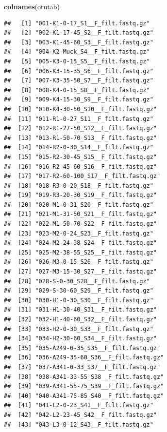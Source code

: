 \documentclass[]{article}
\newenvironment{Shaded}{\begin{snugshade}}{\end{snugshade}}
\newcommand{\KeywordTok}[1]{\textcolor[rgb]{0.13,0.29,0.53}{\textbf{#1}}}
\newcommand{\NormalTok}[1]{#1}
\begin{document}
\begin{Shaded}
\begin{Highlighting}[]
\KeywordTok{colnames}\NormalTok{(otutab)}
\end{Highlighting}
\end{Shaded}

\begin{verbatim}
##   [1] "001-K1-0-17_S1__F_filt.fastq.gz"         
##   [2] "002-K1-17-45_S2__F_filt.fastq.gz"        
##   [3] "003-K1-45-60_S3__F_filt.fastq.gz"        
##   [4] "004-K2-Muck_S4__F_filt.fastq.gz"         
##   [5] "005-K3-0-15_S5__F_filt.fastq.gz"         
##   [6] "006-K3-15-35_S6__F_filt.fastq.gz"        
##   [7] "007-K3-35-50_S7__F_filt.fastq.gz"        
##   [8] "008-K4-0-15_S8__F_filt.fastq.gz"         
##   [9] "009-K4-15-30_S9__F_filt.fastq.gz"        
##  [10] "010-K4-30-50_S10__F_filt.fastq.gz"       
##  [11] "011-R1-0-27_S11__F_filt.fastq.gz"        
##  [12] "012-R1-27-50_S12__F_filt.fastq.gz"       
##  [13] "013-R1-50-70_S13__F_filt.fastq.gz"       
##  [14] "014-R2-0-30_S14__F_filt.fastq.gz"        
##  [15] "015-R2-30-45_S15__F_filt.fastq.gz"       
##  [16] "016-R2-45-60_S16__F_filt.fastq.gz"       
##  [17] "017-R2-60-100_S17__F_filt.fastq.gz"      
##  [18] "018-R3-0-20_S18__F_filt.fastq.gz"        
##  [19] "019-R3-20-30_S19__F_filt.fastq.gz"       
##  [20] "020-M1-0-31_S20__F_filt.fastq.gz"        
##  [21] "021-M1-31-50_S21__F_filt.fastq.gz"       
##  [22] "022-M1-50-70_S22__F_filt.fastq.gz"       
##  [23] "023-M2-0-24_S23__F_filt.fastq.gz"        
##  [24] "024-M2-24-38_S24__F_filt.fastq.gz"       
##  [25] "025-M2-38-55_S25__F_filt.fastq.gz"       
##  [26] "026-M3-0-15_S26__F_filt.fastq.gz"        
##  [27] "027-M3-15-30_S27__F_filt.fastq.gz"       
##  [28] "028-S-0-30_S28__F_filt.fastq.gz"         
##  [29] "029-S-30-60_S29__F_filt.fastq.gz"        
##  [30] "030-H1-0-30_S30__F_filt.fastq.gz"        
##  [31] "031-H1-30-40_S31__F_filt.fastq.gz"       
##  [32] "032-H1-40-60_S32__F_filt.fastq.gz"       
##  [33] "033-H2-0-30_S33__F_filt.fastq.gz"        
##  [34] "034-H2-30-60_S34__F_filt.fastq.gz"       
##  [35] "035-A249-0-35_S35__F_filt.fastq.gz"      
##  [36] "036-A249-35-60_S36__F_filt.fastq.gz"     
##  [37] "037-A341-0-33_S37__F_filt.fastq.gz"      
##  [38] "038-A341-33-55_S38__F_filt.fastq.gz"     
##  [39] "039-A341-55-75_S39__F_filt.fastq.gz"     
##  [40] "040-A341-75-85_S40__F_filt.fastq.gz"     
##  [41] "041-L2-0-23_S41__F_filt.fastq.gz"        
##  [42] "042-L2-23-45_S42__F_filt.fastq.gz"       
##  [43] "043-L3-0-12_S43__F_filt.fastq.gz"        

\end{verbatim}
\end{document}
